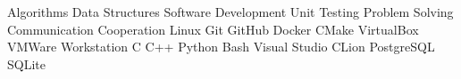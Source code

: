 
\begin{cventries}
    \cventryii
        {Algorithms \cvseparator Data Structures \cvseparator Software Development \cvseparator Unit Testing}
        {}
    \cventryii
        {Problem Solving \cvseparator Communication \cvseparator Cooperation}
        {}
    \cventryii
        {Linux \cvseparator Git \cvseparator GitHub \cvseparator Docker \cvseparator CMake}
        {}
    \cventryii
        {VirtualBox \cvseparator VMWare Workstation}
        {}
    \cventryii
        {C \cvseparator C++ \cvseparator Python \cvseparator Bash}
        {}
    \cventryii
        {Visual Studio \cvseparator CLion}
        {}
    \cventryii
        {PostgreSQL \cvseparator SQLite}
        {}
\end{cventries}
